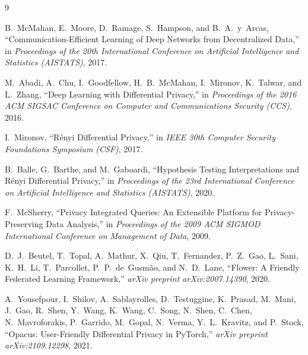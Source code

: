 \documentclass[11pt,a4paper]{article}
\begin{document}
\begin{thebibliography}{9}

B.~McMahan, E.~Moore, D.~Ramage, S.~Hampson, and B.~A.~y~Arcas,
``Communication-Efficient Learning of Deep Networks from Decentralized Data,''
in \emph{Proceedings of the 20th International Conference on Artificial Intelligence and Statistics (AISTATS)}, 2017.

M.~Abadi, A.~Chu, I.~Goodfellow, H.~B.~McMahan, I.~Mironov, K.~Talwar, and L.~Zhang,
``Deep Learning with Differential Privacy,''
in \emph{Proceedings of the 2016 ACM SIGSAC Conference on Computer and Communications Security (CCS)}, 2016.

I.~Mironov,
``R{\'e}nyi Differential Privacy,''
in \emph{IEEE 30th Computer Security Foundations Symposium (CSF)}, 2017.

B.~Balle, G.~Barthe, and M.~Gaboardi,
``Hypothesis Testing Interpretations and R{\'e}nyi Differential Privacy,''
in \emph{Proceedings of the 23rd International Conference on Artificial Intelligence and Statistics (AISTATS)}, 2020.

F.~McSherry,
``Privacy Integrated Queries: An Extensible Platform for Privacy-Preserving Data Analysis,''
in \emph{Proceedings of the 2009 ACM SIGMOD International Conference on Management of Data}, 2009.

D.~J.~Beutel, T.~Topal, A.~Mathur, X.~Qiu, T.~Fernandez, P.~Z.~Gao, L.~Sani, K.~H.~Li, T.~Parcollet, P.~P.~de~Gusm{\~a}o, and N.~D.~Lane,
``Flower: A Friendly Federated Learning Framework,''
\emph{arXiv preprint arXiv:2007.14390}, 2020.

A.~Yousefpour, I.~Shilov, A.~Sablayrolles, D.~Testuggine, K.~Prasad, M.~Mani, J.~Gao, R.~Shen, Y.~Wang, K.~Wang, C.~Song, N.~Shen, C.~Chen, N.~Mavroforakis, P.~Garrido, M.~Gopal, N.~Verma, Y.~L.~Kravitz, and P.~Stock,
``Opacus: User-Friendly Differential Privacy in PyTorch,''
\emph{arXiv preprint arXiv:2109.12298}, 2021.

\end{thebibliography}
\end{document}
